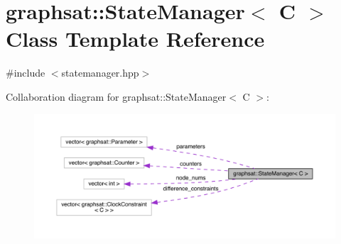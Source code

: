 \hypertarget{classgraphsat_1_1_state_manager}{}\section{graphsat\+::State\+Manager$<$ C $>$ Class Template Reference}
\label{classgraphsat_1_1_state_manager}


{\ttfamily \#include $<$statemanager.\+hpp$>$}



Collaboration diagram for graphsat\+::State\+Manager$<$ C $>$\+:
\nopagebreak
\begin{figure}[H]
\begin{center}
\leavevmode
\includegraphics[width=350pt]{classgraphsat_1_1_state_manager__coll__graph}
\end{center}
\end{figure}
